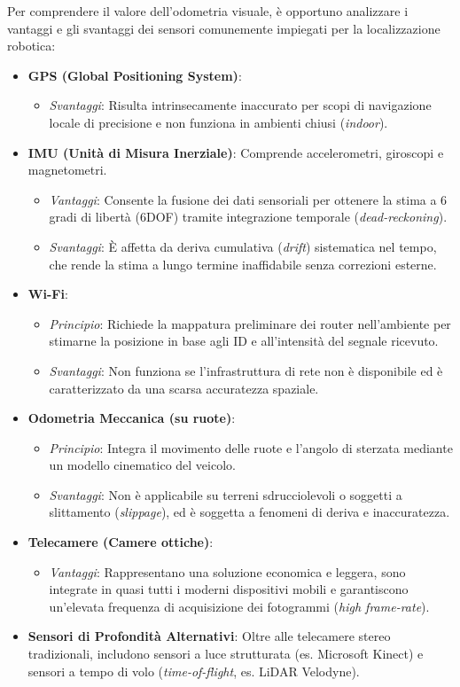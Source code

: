 ﻿\documentclass[11pt, a4paper]{article}
\begin{document}
Per comprendere il valore dell'odometria visuale, è opportuno analizzare i vantaggi e gli svantaggi dei sensori comunemente impiegati per la localizzazione robotica:

\begin{itemize}
    \item \textbf{GPS (Global Positioning System)}:
    \begin{itemize}
        \item \emph{Svantaggi}: Risulta intrinsecamente inaccurato per scopi di navigazione locale di precisione e non funziona in ambienti chiusi (\emph{indoor}).
    \end{itemize}
    \item \textbf{IMU (Unità di Misura Inerziale)}: Comprende accelerometri, giroscopi e magnetometri.
    \begin{itemize}
        \item \emph{Vantaggi}: Consente la fusione dei dati sensoriali per ottenere la stima a 6 gradi di libertà (6DOF) tramite integrazione temporale (\emph{dead-reckoning}).
        \item \emph{Svantaggi}: È affetta da deriva cumulativa (\emph{drift}) sistematica nel tempo, che rende la stima a lungo termine inaffidabile senza correzioni esterne.
    \end{itemize}
    \item \textbf{Wi-Fi}:
    \begin{itemize}
        \item \emph{Principio}: Richiede la mappatura preliminare dei router nell'ambiente per stimarne la posizione in base agli ID e all'intensità del segnale ricevuto.
        \item \emph{Svantaggi}: Non funziona se l'infrastruttura di rete non è disponibile ed è caratterizzato da una scarsa accuratezza spaziale.
    \end{itemize}
    \item \textbf{Odometria Meccanica (su ruote)}:
    \begin{itemize}
        \item \emph{Principio}: Integra il movimento delle ruote e l'angolo di sterzata mediante un modello cinematico del veicolo.
        \item \emph{Svantaggi}: Non è applicabile su terreni sdrucciolevoli o soggetti a slittamento (\emph{slippage}), ed è soggetta a fenomeni di deriva e inaccuratezza.
    \end{itemize}
    \item \textbf{Telecamere (Camere ottiche)}:
    \begin{itemize}
        \item \emph{Vantaggi}: Rappresentano una soluzione economica e leggera, sono integrate in quasi tutti i moderni dispositivi mobili e garantiscono un'elevata frequenza di acquisizione dei fotogrammi (\emph{high frame-rate}).
    \end{itemize}
    \item \textbf{Sensori di Profondità Alternativi}: Oltre alle telecamere stereo tradizionali, includono sensori a luce strutturata (es. Microsoft Kinect) e sensori a tempo di volo (\emph{time-of-flight}, es. LiDAR Velodyne).
\end{itemize}
\end{document}

